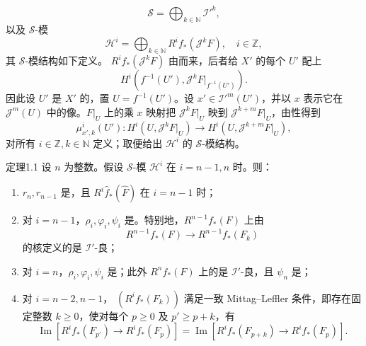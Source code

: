 \[\mathcal S=\bigoplus_{k\in\mathbb N}\mathcal I'^k,\tag{1.8}\]
以及 $\mathcal S$-模
\[\mathcal H^i=\bigoplus_{k\in\mathbb N}R^if_*(\mathcal J^kF),\quad i\in\mathbb Z,\tag{1.9}\]
其 $\mathcal S$-模结构如下定义。 $R^if_*(\mathcal J^kF)$ 由而来，后者给 $X'$ 的每个 $U'$ 配上
\[H^i(f^{-1}(U'),\mathcal J^kF|_{f^{-1}(U')}).\tag{1.10}\]
因此设 $U'$ 是 $X'$ 的，置 $U=f^{-1}(U')$。设 $x'\in\mathcal I'^m(U')$，并以 $x$ 表示它在 $\mathcal J^m(U)$ 中的像。$F|_U$ 上的乘 $x$ 映射把 $\mathcal J^kF|_U$ 映到 $\mathcal J^{k+m}F|_U$，由性得到
\[\mu^i_{x',k}(U'):H^i(U,\mathcal J^kF|_U)\longrightarrow H^i(U,\mathcal J^{k+m}F|_U),\tag{1.11}\]
对所有 $i\in\mathbb Z,k\in\mathbb N$ 定义；取便给出 $\mathcal H^i$ 的 $\mathcal S$-模结构。
\begin{SGAresult}{定理}{1.1}
设 $n$ 为整数。假设 $\mathcal S$-模 $\mathcal H^i$ 在 $i=n-1,n$ 时。则：
\begin{enumerate}
\item[(0)] $r_n,r_{n-1}$ 是，且 $R^i\widehat f_*(\widehat F)$ 在 $i=n-1$ 时；
\item[(1)] 对 $i=n-1$，$\rho_i,\varphi_i,\psi_i$ 是。特别地，$R^{n-1}f_*(F)$ 上由
\[R^{n-1}f_*(F)\longrightarrow R^{n-1}f_*(F_k)\tag{1.12}\]
的核定义的是 $\mathcal I'$-良；
\item[(2)] 对 $i=n$，$\rho_i,\varphi_i,\psi_i$ 是；此外 $R^nf_*(F)$ 上的是 $\mathcal I'$-良，且 $\psi_n$ 是；
\item[(3)] 对 $i=n-2,n-1$， $(R^if_*(F_k))$ 满足一致 Mittag--Leffler 条件，即存在固定整数 $k\geq0$，使对每个 $p\geq0$ 及 $p'\geq p+k$，有
\[\operatorname{Im}[R^if_*(F_{p'})\to R^if_*(F_p)]=\operatorname{Im}[R^if_*(F_{p+k})\to R^if_*(F_p)].\]
\end{enumerate}
\end{SGAresult}
